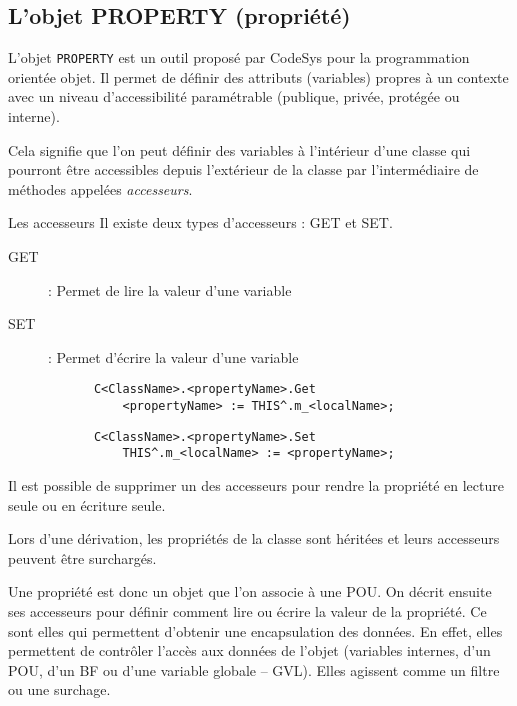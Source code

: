 \subsection{L'objet PROPERTY (propriété)}
\label{subsec:property}
L'objet \lstinline{PROPERTY} est un outil proposé par CodeSys pour la programmation orientée objet. Il permet de définir des attributs (variables) propres à un contexte avec un niveau d'accessibilité paramétrable (publique, privée, protégée ou interne).

Cela signifie que l'on peut définir des variables à l'intérieur d'une classe qui pourront être accessibles depuis l'extérieur de la classe par l'intermédiaire de méthodes appelées \emph{accesseurs}.

\begin{UPSTIinfor}{Les accesseurs}
    Il existe deux types d'accesseurs : GET et SET. 
    \begin{description}
        \item[GET] : Permet de lire la valeur d'une variable
        \item[SET] : Permet d'écrire la valeur d'une variable
    \end{description}
    \begin{minipage}{.45\linewidth}
        \begin{lstlisting}
            C<ClassName>.<propertyName>.Get 
                <propertyName> := THIS^.m_<localName>;
        \end{lstlisting}
    \end{minipage}%
    \hfill
    \begin{minipage}{.45\linewidth}
        \begin{lstlisting}
            C<ClassName>.<propertyName>.Set 
                THIS^.m_<localName> := <propertyName>;
        \end{lstlisting}
    \end{minipage}

    Il est possible de supprimer un des accesseurs pour rendre la propriété en lecture seule ou en écriture seule.

    Lors d'une dérivation, les propriétés de la classe sont héritées et leurs accesseurs peuvent être surchargés.
\end{UPSTIinfor}

Une propriété est donc un objet que l'on associe à une POU. On décrit ensuite ses accesseurs pour définir comment lire ou écrire la valeur de la propriété.
Ce sont elles qui permettent d'obtenir une encapsulation des données. En effet, elles permettent de contrôler l'accès aux données de l'objet (variables internes, d'un POU, d'un BF ou d'une variable globale -- GVL). Elles agissent comme un filtre ou une surchage. 



